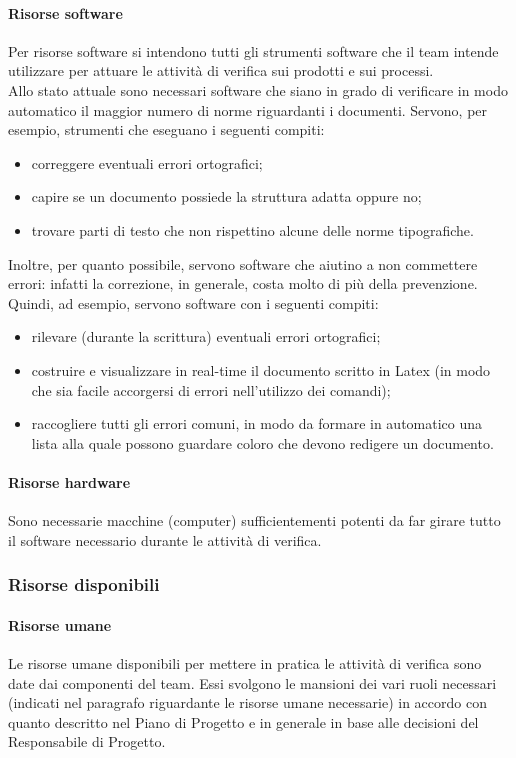 				\paragraph{Risorse software}
					Per risorse software si intendono tutti gli strumenti software che il team intende utilizzare per attuare le attività di verifica sui 
					prodotti e sui processi.\\
					Allo stato attuale sono necessari software che siano in grado di verificare in modo automatico il maggior numero di norme riguardanti 
					i documenti. Servono, per esempio, strumenti che eseguano i seguenti compiti:
					\begin{itemize}
						\item correggere eventuali errori ortografici;
						\item capire se un documento possiede la struttura adatta oppure no;
						\item trovare parti di testo che non rispettino alcune delle norme tipografiche.
					\end{itemize}
					Inoltre, per quanto possibile, servono software che aiutino a non commettere errori: infatti la correzione, in generale, costa 
					molto di più della prevenzione. Quindi, ad esempio, servono software con i seguenti compiti:
					\begin{itemize}
						\item rilevare (durante la scrittura) eventuali errori ortografici;
						\item costruire e visualizzare in real-time il documento scritto in Latex (in modo che sia facile accorgersi di errori 
						nell'utilizzo dei comandi);
						\item raccogliere tutti gli errori comuni, in modo da formare in automatico una lista alla quale possono guardare coloro che 
						devono redigere un documento. 
					\end{itemize}
				\paragraph{Risorse hardware}
					Sono necessarie macchine (computer) sufficientementi potenti da far girare tutto il software necessario durante le attività di verifica.
			\subsubsection{Risorse disponibili}
				\paragraph{Risorse umane}
					Le risorse umane disponibili per mettere in pratica le attività di verifica sono date dai componenti del team. Essi svolgono le 
					mansioni dei vari ruoli necessari (indicati nel paragrafo riguardante le risorse umane necessarie) in accordo con quanto descritto 
					nel Piano di Progetto e in generale in base alle decisioni del Responsabile di Progetto.
